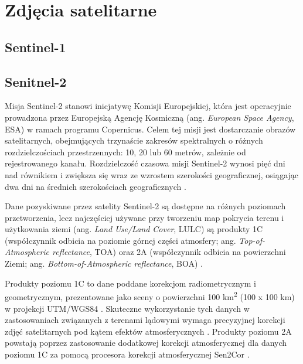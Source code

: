 \documentclass{amuthesis}
\begin{document}
\hypertarget{sec-satellite-imagery}{%
\section{Zdjęcia satelitarne}\label{sec-satellite-imagery}}

\hypertarget{sec-sentinel1}{%
\subsection{Sentinel-1}\label{sec-sentinel1}}

\hypertarget{sec-sentinel2}{%
\subsection{Senitnel-2}\label{sec-sentinel2}}

Misja Sentinel-2 stanowi inicjatywę Komisji Europejskiej, która jest
operacyjnie prowadzona przez Europejską Agencję Kosmiczną (ang.
\emph{European Space Agency}, ESA) w ramach programu Copernicus. Celem
tej misji jest dostarczanie obrazów satelitarnych, obejmujących
trzynaście zakresów spektralnych o różnych rozdzielczościach
przestrzennych: 10, 20 lub 60 metrów, zależnie od rejestrowanego kanału.
Rozdzielczość czasowa misji Sentinel-2 wynosi pięć dni nad równikiem i
zwiększa się wraz ze wzrostem szerokości geograficznej, osiągając dwa
dni na średnich szerokościach geograficznych
\autocite{hejmanowska_2020_dane}.

Dane pozyskiwane przez satelity Sentinel-2 są dostępne na różnych
poziomach przetworzenia, lecz najczęściej używane przy tworzeniu map
pokrycia terenu i użytkowania ziemi (ang. \emph{Land Use/Land Cover},
LULC) są produkty 1C (współczynnik odbicia na poziomie górnej części
atmosfery; ang. \emph{Top-of-Atmospheric reflectance}, TOA) oraz 2A
(współczynnik odbicia na powierzchni Ziemi; ang.
\emph{Bottom-of-Atmospheric reflectance}, BOA)
\autocite{phiri_2020_sentinel2}.

Produkty poziomu 1C to dane poddane korekcjom radiometrycznym i
geometrycznym, prezentowane jako sceny o powierzchni 100
km\textsuperscript{2} (100 x 100 km) w projekcji UTM/WGS84
\autocite{esa_2015_sentinel2handbook}. Skuteczne wykorzystanie tych
danych w zastosowaniach związanych z terenami lądowymi wymaga
precyzyjnej korekcji zdjęć satelitarnych pod kątem efektów
atmosferycznych \autocite{main-knorn_2017_Sen2Cor}. Produkty poziomu 2A
powstają poprzez zastosowanie dodatkowej korekcji atmosferycznej dla
danych poziomu 1C za pomocą procesora korekcji atmosferycznej Sen2Cor
\autocite{main-knorn_2017_Sen2Cor}.
\end{document}
